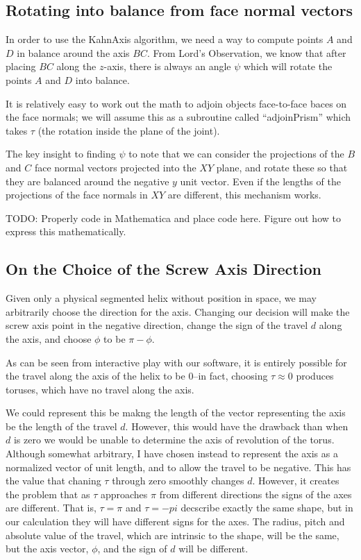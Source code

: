 \documentclass[11pt]{article}
\begin{document}
{\subsection{Rotating into balance from face normal vectors}

In order to use the KahnAxis algorithm, we need a way
to compute points $A$ and $D$ in balance around the axis $BC$.
From Lord's Observation, we know that after placing $BC$ along
the $z$-axis, there is always an angle $\psi$ which will
rotate the points $A$ and $D$ into balance.

It is relatively easy to work out the math to adjoin objects
face-to-face baces on the face normals; we will assume this
as a subroutine called ``adjoinPrism'' which takes $\tau$
(the rotation inside the plane of the joint).

The key insight to finding $\psi$ to note that we
can consider the projections of the $B$ and $C$ face normal vectors
projected into the $XY$ plane, and rotate these so that they
are balanced around the negative $y$ unit vector. Even
if the lengths of the projections of the face normals in $XY$
are different, this mechanism works.

TODO: Properly code in Mathematica and place code here.
Figure out how to express this mathematically.

\subsection{On the Choice of the Screw Axis Direction}

Given only a physical segmented helix without position in space, we may arbitrarily choose the
direction for the axis. Changing our decision will make the screw axis point in the negative direction,
change the sign of the travel $d$ along the axis, and choose $\phi$ to be $\pi - \phi$.

As can be seen from interactive play with our software, it is entirely possible for the travel along
the axis of the helix to be $0$--in fact, choosing $\tau \approx 0$ produces toruses, which have no
travel along the axis.

We could represent this be makng the length of the vector representing the axis be the length of the
travel $d$. However, this would have the drawback than when $d$ is zero we would be unable to determine
the axis of revolution of the torus. Although somewhat arbitrary, I have chosen instead to represent the
axis as a normalized vector of unit length, and to allow the travel to be negative. This has the value that
chaning $\tau$ through zero smoothly changes $d$. However, it creates the problem that as $\tau$ approaches
$\pi$ from different directions the signs of the axes are different. That is, $\tau = \pi$ and $\tau = -pi$ decscribe exactly
the same shape, but in our calculation they will have different signs for the axes. The radius, pitch and
absolute value of the travel,
which are intrinsic to the shape, will be the same, but the axis vector, $\phi$, and the sign of $d$ will be different.

}
\end{document}
